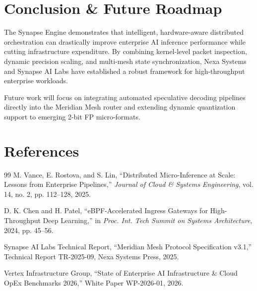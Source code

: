 \documentclass[10pt, a4paper]{article}
\begin{document}
\vspace{10pt}

\section{Conclusion \& Future Roadmap}
The Synapse Engine demonstrates that intelligent, hardware-aware distributed orchestration can drastically improve enterprise AI inference performance while cutting infrastructure expenditure. By combining kernel-level packet inspection, dynamic precision scaling, and multi-mesh state synchronization, Nexa Systems and Synapse AI Labs have established a robust framework for high-throughput enterprise workloads.

Future work will focus on integrating automated speculative decoding pipelines directly into the Meridian Mesh router and extending dynamic quantization support to emerging 2-bit FP micro-formats.

\vspace{15pt}

\section*{References}
\begin{thebibliography}{99}
\small
{}
M. Vance, E. Rostova, and S. Lin, ``Distributed Micro-Inference at Scale: Lessons from Enterprise Pipelines,'' \emph{Journal of Cloud \& Systems Engineering}, vol. 14, no. 2, pp. 112--128, 2025.

D. K. Chen and H. Patel, ``eBPF-Accelerated Ingress Gateways for High-Throughput Deep Learning,'' in \emph{Proc. Int. Tech Summit on Systems Architecture}, 2024, pp. 45--56.

Synapse AI Labs Technical Report, ``Meridian Mesh Protocol Specification v3.1,'' Technical Report TR-2025-09, Nexa Systems Press, 2025.

Vertex Infrastructure Group, ``State of Enterprise AI Infrastructure \& Cloud OpEx Benchmarks 2026,'' White Paper WP-2026-01, 2026.
\end{thebibliography}
\end{document}
